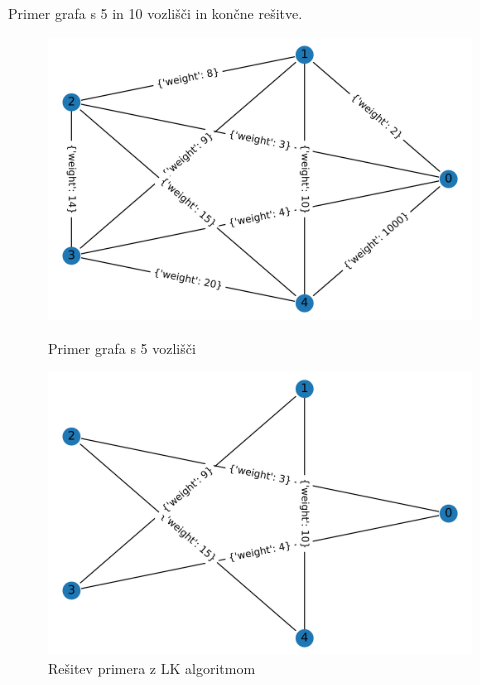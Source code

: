 \documentclass[12pt, a4paper]{article}
\begin{document}
Primer grafa s 5 in 10 vozlišči in končne rešitve.

\begin{figure}[!h]
    
    \begin{minipage}{0.5\textwidth}
    \includegraphics[width=7 cm]{primeri/primer1.png}
    \caption{Primer grafa s 5 vozlišči}
    \label{primer_LK}
  \end{minipage}
 \hspace{1cm}
  \begin{minipage}{0.5\textwidth}
    \includegraphics[width=7 cm]{primeri/primer1_lk.png}
    \caption{Rešitev primera z LK algoritmom}
    \label{resitev_LK}
  \end{minipage}
    
\end{figure}
\end{document}
